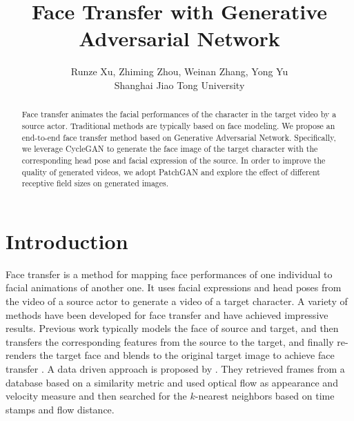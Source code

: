 \documentclass[letterpaper]{article} %
\begin{document}
	
	\title{Face Transfer with Generative Adversarial Network}
	\author{
		Runze Xu, Zhiming Zhou, Weinan Zhang, Yong Yu\\
		Shanghai Jiao Tong University%
	}
	\maketitle
	\begin{abstract}
		Face transfer animates the facial performances of the character in the target video by a source actor. Traditional methods are typically based on face modeling. We propose an end-to-end face transfer method based on Generative Adversarial Network. Specifically, we leverage CycleGAN to generate the face image of the target character with the corresponding head pose and facial expression of the source. In order to improve the quality of generated videos, we adopt PatchGAN and explore the effect of different receptive field sizes on generated images.
		
	\end{abstract}
	
	\section{Introduction}
	Face transfer is a method for mapping face performances of one individual to facial animations of another one. It uses facial expressions and head poses from the video of a source actor to generate a video of a target character. A variety of methods have been developed for face transfer and have achieved impressive results. Previous work typically models the face of source and target, and then transfers the corresponding features from the source to the target, and finally re-renders the target face and blends to the original target image to achieve face transfer \cite{vlasic2005face,shi2014automatic,thies2016face2face}.  A data driven approach is proposed by \cite{li2012data}. They retrieved frames from a database based on a similarity metric and used optical flow as appearance and velocity measure and then searched for the $k$-nearest neighbors based on time stamps and flow distance. %
	
\end{document}
